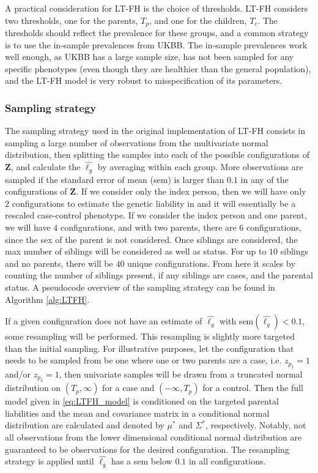 A practical consideration for LT-FH is the choice of thresholds. LT-FH considers two thresholds, one for the parents, $ T_p $, and one for the children, $ T_c $. The thresholds should reflect the prevalence for these groups, and a common strategy is to use the in-sample prevalences from UKBB. The in-sample prevalences work well enough, as UKBB has a large sample size, has not been sampled for any specific phenotypes (even though they are healthier than the general population), and the LT-FH model is very robust to misspecification of its parameters.

\subsubsection{Sampling strategy}

The sampling strategy used in the original implementation of LT-FH consists in sampling a large number of observations from the multivariate normal distribution, then splitting the samples into each of the possible configurations of $ \mathbf{Z} $, and calculate the $ \hat{\ell_g} $ by averaging within each group. More observations are sampled if the standard error of mean (sem) is larger than $ 0.1 $ in any of the configurations of $ \mathbf{Z} $. If we consider only the index person, then we will have only $ 2 $ configurations to estimate the genetic liability in and it will essentially be a rescaled case-control phenotype. If we consider the index person and one parent, we will have $ 4 $ configurations, and with two parents, there are $ 6 $ configurations, since the sex of the parent is not considered. Once siblings are considered, the max number of siblings will be considered as well as status. For up to $ 10 $ siblings and no parents, there will be $ 40 $ unique configurations. From here it scales by counting the number of siblings present, if any siblings are cases, and the parental status. A pseudocode overview of the sampling strategy can be found in Algorithm \ref{alg:LTFH}.

If a given configuration does not have an estimate of $ \hat{\ell_g} $ with sem$(\hat{\ell_g}) < 0.1 $, some resampling will be performed. This resampling is slightly more targeted than the initial sampling. For illustrative purposes, let the configuration that needs to be sampled from be one where one or two parents are a case, i.e. $ z_{p_1}  = 1$ and/or $ z_{p_2} = 1$, then univariate samples will be drawn from a truncated normal distribution on $ (T_p, \infty) $ for a case and $ (-\infty, T_p) $ for a control. Then the full model given in \cref{eq:LTFH_model} is conditioned on the targeted parental liabilities and the mean and covariance matrix in a conditional normal distribution are calculated and denoted by $ \mu^{\ast} $ and $ \Sigma^{\ast} $, respectively. Notably, not all observations from the lower dimensional conditional normal distribution are guaranteed to be observations for the desired configuration. The resampling strategy is applied until $ \hat{\ell_g} $ has a sem below $ 0.1 $ in all configurations.


